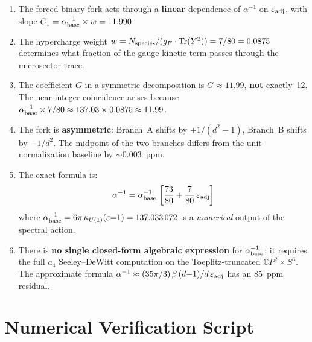 \documentclass[12pt,a4paper]{article}
\begin{document}
\begin{enumerate}
\item The forced binary fork acts through a \textbf{linear} dependence of
  $\alpha^{-1}$ on $\varepsilon_{\rm adj}$, with slope
  $C_1 = \alpha^{-1}_{\rm base} \times w = 11.990$.

\item The hypercharge weight $w = N_{\rm species}/(g_F \cdot \mathrm{Tr}(Y^2))
  = 7/80 = 0.0875$ determines what fraction of the gauge kinetic term
  passes through the microsector trace.

\item The coefficient $G$ in a symmetric decomposition is
  $G \approx 11.99$, \textbf{not} exactly~12.
  The near-integer coincidence arises because
  $\alpha^{-1}_{\rm base} \times 7/80 \approx 137.03 \times 0.0875
  \approx 11.99$.

\item The fork is \textbf{asymmetric}: Branch~A shifts by $+1/(d^2{-}1)$,
  Branch~B shifts by $-1/d^2$. The midpoint of the two branches differs
  from the unit-normalization baseline by $\sim 0.003$~ppm.

\item The exact formula is:
  \begin{equation}
  \alpha^{-1} = \alpha^{-1}_{\rm base}\,
  \left[\frac{73}{80} + \frac{7}{80}\,\varepsilon_{\rm adj}\right]
  \end{equation}
  where $\alpha^{-1}_{\rm base} = 6\pi\,\kappa_{U(1)}(\varepsilon{=}1)
  = 137.033\,072$ is a \emph{numerical} output of the spectral action.

\item There is \textbf{no single closed-form algebraic expression} for
  $\alpha^{-1}_{\rm base}$; it requires the full $a_4$ Seeley--DeWitt
  computation on the Toeplitz-truncated $\mathbb{C}P^2 \times S^3$.
  The approximate formula
  $\alpha^{-1} \approx (35\pi/3)\,\beta\,(d{-}1)/d\,\varepsilon_{\rm adj}$
  has an 85~ppm residual.
\end{enumerate}

\section*{Numerical Verification Script}
\end{document}
